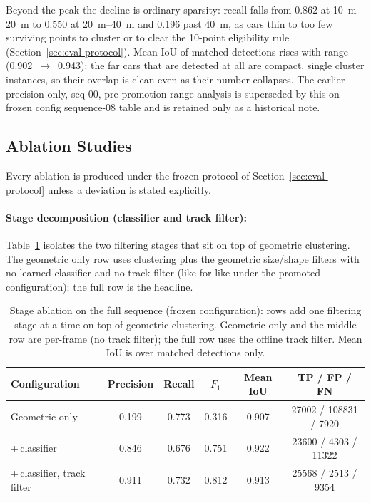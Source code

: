 \documentclass[a4paper,12pt]{report}
\begin{document}
Beyond the peak the decline is ordinary sparsity: recall falls from \num{0.862}
at \SIrange{10}{20}{\metre} to \num{0.550} at \SIrange{20}{40}{\metre} and
\num{0.196} past \SI{40}{\metre}, as cars thin to too few surviving points to
cluster or to clear the \num{10}-point eligibility rule (Section~\ref{sec:eval-protocol}).
Mean IoU of matched detections rises with range
(\num{0.902}~$\rightarrow$~\num{0.943}): the far cars that are detected at all are
compact, single cluster instances, so their overlap is clean even as their number
collapses. The earlier precision only, seq-00, pre-promotion range analysis is superseded by this on frozen config sequence-08 table and is
retained only as a historical note.

\subsection{Ablation Studies}
\label{sec:abl-detection}
\label{sec:results-ablations}

Every ablation is produced under the frozen protocol of
Section~\ref{sec:eval-protocol} unless a deviation is stated explicitly.

\paragraph{Stage decomposition (classifier and track filter):}
\label{sec:ablation-stage}

Table~\ref{tab:ablation-stage} isolates the two filtering stages that sit on top
of geometric clustering. The geometric only row uses clustering plus the
geometric size/shape filters with no learned classifier and no
track filter (like-for-like under the promoted
configuration); the full row is the headline.

\begin{table}[H]
  \centering
  \caption[Stage ablation]{Stage ablation on the full sequence (frozen
    configuration): rows add one filtering stage at a time on top of geometric clustering.
    Geometric-only and the middle row are per-frame (no track filter); the full row uses the
    offline track filter. Mean IoU is over matched detections only.}
  \label{tab:ablation-stage}
  \setlength{\tabcolsep}{5pt}
  \begin{tabular}{lccccc}
    \toprule
    Configuration & Precision & Recall & $F_1$ & Mean IoU & TP / FP / FN \\
    \midrule
    Geometric only                & 0.199 & 0.773 & 0.316 & 0.907 & \num{27002} / \num{108831} / \num{7920} \\
    \;+\,classifier              & 0.846 & 0.676 & 0.751 & 0.922 & \num{23600} / \num{4303} / \num{11322} \\
    \;+\,classifier, track filter & 0.911 & 0.732 & 0.812 & 0.913 & \num{25568} / \num{2513} / \num{9354} \\
    \bottomrule
  \end{tabular}
\end{table}
\end{document}
